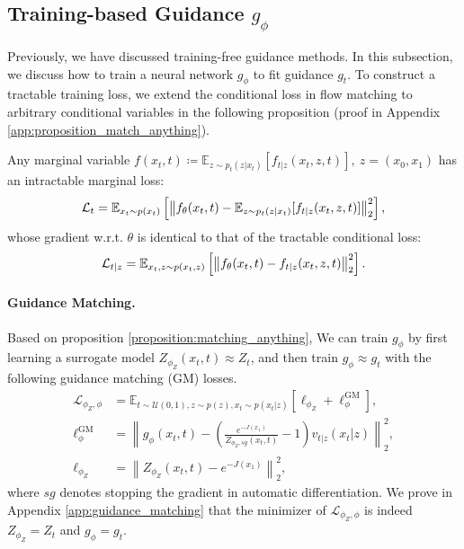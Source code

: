 
\subsection{Training-based Guidance $g_\phi$}
\label{sec:g_learned}




Previously, we have discussed training-free guidance methods. In this subsection, we discuss how to train a neural network $g_\phi$ to fit guidance $g_t$.
To construct a tractable training loss, we extend the conditional loss in flow matching to arbitrary conditional variables in the following proposition (proof in Appendix \ref{app:proposition_match_anything}).
\begin{proposition}\label{proposition:matching_anything}
    Any marginal variable $f(x_t,t)\coloneqq \mathbb{E}_{z\sim p_t(z|x_t)}[f_{t|z}(x_t,z,t)],~z=(x_0,x_1)$ has an intractable marginal loss:
    \vspace{-5pt}
    \begin{equation}\nonumber
    \vspace{-5pt}
    \mathcal{L}_t=\mathbb{E}_{x_t\sim p(x_t)}\left[\left\|f_{{\theta}}(x_t,t) - \mathbb{E}_{z\sim p_t(z|x_t)}[f_{t|z}(x_t,z,t)]\right\|_2^2\right],
    \end{equation}
    whose gradient w.r.t. $\theta$ is identical to that of the tractable conditional loss:
    \vspace{-5pt}
    \begin{equation}\nonumber
    \mathcal{L}_{t|z}=\mathbb{E}_{x_t,z\sim p(x_t,z)}\left[\left\|f_{\theta}(x_t,t) - f_{t|z}(x_t,z,t)\right\|_2^2\right].
    \vspace{-5pt}
    \end{equation}
\end{proposition}
\paragraph{Guidance Matching.} Based on proposition \ref{proposition:matching_anything}, We can train $g_\phi$ by first learning a surrogate model $Z_{\phi_Z}(x_t,t) \approx Z_t $, and then train $g_\phi\approx g_t$ with the following guidance matching (GM) losses.
\begin{align}\label{eq:guidance_matching_loss_sum}
    \mathcal{L}_{\phi_Z,\phi} &= 
    \mathbb{E}_{t\sim\mathcal{U}(0,1),z\sim p(z),x_t \sim p(x_t|z)} [\ell_{\phi_Z} + \ell_{\phi}^{\text{GM}}],\\
    \nonumber
    \ell_{\phi}^{\text{GM}} &= 
    \left\|g_{\phi}(x_t,t) - \left(\frac{e^{-J(x_1)}}{Z_{\phi_Z,sg}(x_t,t)} - 1\right) v_{t|z}(x_t|z)\right\|_2^2,
    \\
    \label{eq:guidance_matching_loss_g_1}
    \ell_{\phi_Z} &= 
    \left\|Z_{\phi_Z}(x_t,t) - e^{-J(x_1)}\right\|_2^2,
\end{align}
where $sg$ denotes stopping the gradient in automatic differentiation.
We prove in Appendix \ref{app:guidance_matching} that the minimizer of $\mathcal{L}_{\phi_Z,\phi}$ is indeed $Z_{\phi_Z} = Z_t$ and $g_{\phi} = g_t$.


